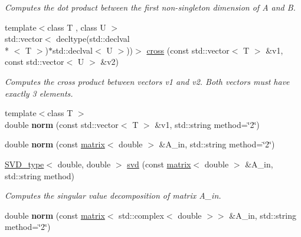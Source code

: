 \begin{DoxyCompactItemize}
\begin{DoxyCompactList}\small\item\em Computes the dot product between the first non-\/singleton dimension of A and B. \end{DoxyCompactList}\item 
\hypertarget{namespacekeycpp_a73fa9874e6923dd54c95d52a22a99d00}{{\footnotesize template$<$class T , class U $>$ }\\std\-::vector$<$ decltype(std\-::declval\\*
$<$ T $>$)$\ast$std\-::declval$<$ U $>$))$>$ \hyperlink{namespacekeycpp_a73fa9874e6923dd54c95d52a22a99d00}{cross} (const std\-::vector$<$ T $>$ \&v1, const std\-::vector$<$ U $>$ \&v2)}\label{namespacekeycpp_a73fa9874e6923dd54c95d52a22a99d00}

\begin{DoxyCompactList}\small\item\em Computes the cross product between vectors v1 and v2. Both vectors must have exactly 3 elements. \end{DoxyCompactList}\item 
\hypertarget{namespacekeycpp_a85adf7a8804f7d7d3c378d86427b4210}{{\footnotesize template$<$class T $>$ }\\double {\bfseries norm} (const std\-::vector$<$ T $>$ \&v1, std\-::string method=\char`\"{}2\char`\"{})}\label{namespacekeycpp_a85adf7a8804f7d7d3c378d86427b4210}

\item 
\hypertarget{namespacekeycpp_aeb34bdd249af3ce92341cdda62f95f65}{double {\bfseries norm} (const \hyperlink{classkeycpp_1_1matrix}{matrix}$<$ double $>$ \&A\-\_\-in, std\-::string method=\char`\"{}2\char`\"{})}\label{namespacekeycpp_aeb34bdd249af3ce92341cdda62f95f65}

\item 
\hypertarget{namespacekeycpp_a838fc93d66e1ab63d68d04781086d81a}{\hyperlink{structkeycpp_1_1_s_v_d__type}{S\-V\-D\-\_\-type}$<$ double, double $>$ \hyperlink{namespacekeycpp_a838fc93d66e1ab63d68d04781086d81a}{svd} (const \hyperlink{classkeycpp_1_1matrix}{matrix}$<$ double $>$ \&A\-\_\-in, std\-::string method)}\label{namespacekeycpp_a838fc93d66e1ab63d68d04781086d81a}

\begin{DoxyCompactList}\small\item\em Computes the singular value decomposition of matrix A\-\_\-in. \end{DoxyCompactList}\item 
\hypertarget{namespacekeycpp_ad211ab5ae14ac9710265c662f70f20ff}{double {\bfseries norm} (const \hyperlink{classkeycpp_1_1matrix}{matrix}$<$ std\-::complex$<$ double $>$$>$ \&A\-\_\-in, std\-::string method=\char`\"{}2\char`\"{})}\label{namespacekeycpp_ad211ab5ae14ac9710265c662f70f20ff}


\end{DoxyCompactItemize}
